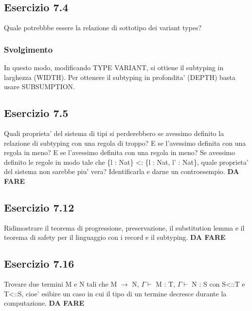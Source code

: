 \subsection*{Esercizio 7.4}
Quale potrebbbe essere la relazione di sottotipo dei variant types? 
 
\subsubsection*{Svolgimento} 
 \begin{prooftree} 
\end{prooftree} 

In questo modo, modificando TYPE VARIANT, si ottiene il subtyping in larghezza (WIDTH). Per ottenere il subtyping in profondita' (DEPTH) basta usare SUBSUMPTION.

\subsection*{Esercizio 7.5}
Quali proprieta' del sistema di tipi si perderebbero se avessimo definito la relazione di
subtyping con una regola di troppo? E se l'avessimo definita con una regola in meno? E se l'avessimo definita con una regola in meno? Se avessimo definito le regole in modo tale che \{l : Nat\} <: \{l : Nat, l' : Nat\}, quale proprieta' del sistema non sarebbe piu' vera? Identificarla e darne un controesempio.
\textbf{{\color{red} DA FARE}}

\subsection*{Esercizio 7.12}
Ridimostrare il teorema di progressione, preservazione, il substitution lemma e il teorema
di safety per il linguaggio con i record e il subtyping. 
\textbf{{\color{red} DA FARE}}

\subsection*{Esercizio 7.16}
Trovare due termini M e N tali che M $\rightarrow$ N, $\Gamma\vdash$ M : T, $\Gamma\vdash$ N : S con S<::T e T<::S, cioe' esibire un caso in cui il tipo di un termine decresce durante la computazione. 
\textbf{{\color{red} DA FARE}}